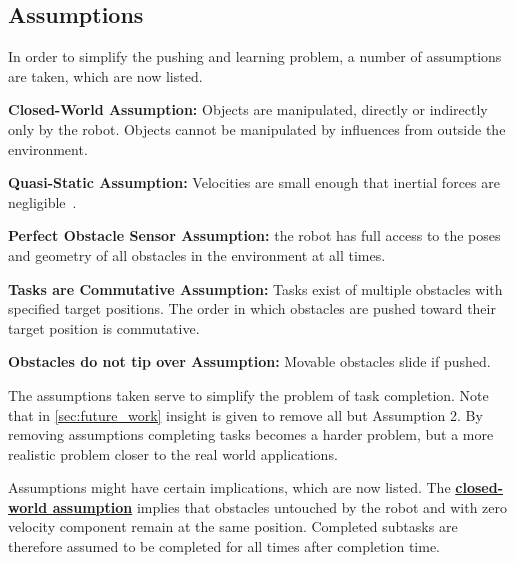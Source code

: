 \subsection{Assumptions}
\label{subsec:assumptions}
In order to simplify the pushing and learning problem, a number of assumptions are taken, which are now listed.\bs

\begin{assumption*}
\label{assumption:closed_world}
\textbf{Closed-World Assumption:} Objects are manipulated, directly or indirectly only by the robot. Objects cannot be manipulated by influences from outside the environment.
\end{assumption*}\bs

\begin{assumption*}
\label{assumption:quasi_static}
\textbf{Quasi-Static Assumption:} Velocities are small enough that inertial forces are negligible~\cite{stuber_let_2020}.
\end{assumption*}\bs

\begin{assumption*}
\label{assumption:perfect_obstacle_sensor}
\textbf{Perfect Obstacle Sensor Assumption:} the robot has full access to the poses and geometry of all obstacles in the environment at all times.
\end{assumption*}\bs

\begin{assumption*}
\label{assumption:order_does_not_matter}
\textbf{Tasks are Commutative Assumption:} Tasks exist of multiple obstacles with specified target positions. The order in which obstacles are pushed toward their target position is commutative.
\end{assumption*}\bs

\begin{assumption*}
\label{assumption:no_tipping}
\textbf{Obstacles do not tip over Assumption:} Movable obstacles slide if pushed.
\end{assumption*}\bs

The assumptions taken serve to simplify the problem of task completion. Note that in \cref{sec:future_work} insight is given to remove all but Assumption 2. By removing assumptions completing tasks becomes a harder problem, but a more realistic problem closer to the real world applications.\bs

Assumptions might have certain implications, which are now listed. The \hyperref[assumption:closed_world]{\textbf{closed-world assumption}} implies that obstacles untouched by the robot and with zero velocity component remain at the same position. Completed subtasks are therefore assumed to be completed for all times after completion time.\bs

